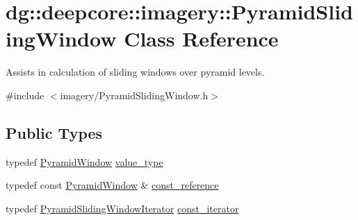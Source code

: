 \hypertarget{classdg_1_1deepcore_1_1imagery_1_1_pyramid_sliding_window}{}\section{dg\+:\+:deepcore\+:\+:imagery\+:\+:Pyramid\+Sliding\+Window Class Reference}
\label{classdg_1_1deepcore_1_1imagery_1_1_pyramid_sliding_window}


Assists in calculation of sliding windows over pyramid levels.  




{\ttfamily \#include $<$imagery/\+Pyramid\+Sliding\+Window.\+h$>$}

\subsection*{Public Types}
\begin{DoxyCompactItemize}
\item 
typedef \hyperlink{structdg_1_1deepcore_1_1imagery_1_1_pyramid_window}{Pyramid\+Window} \hyperlink{classdg_1_1deepcore_1_1imagery_1_1_pyramid_sliding_window_ab19431f1af5d94cf35d3c13e62831b0a}{value\+\_\+type}
\item 
typedef const \hyperlink{structdg_1_1deepcore_1_1imagery_1_1_pyramid_window}{Pyramid\+Window} \& \hyperlink{classdg_1_1deepcore_1_1imagery_1_1_pyramid_sliding_window_a2607e7416973611462d45f5a3772b46e}{const\+\_\+reference}
\item 
typedef \hyperlink{classdg_1_1deepcore_1_1imagery_1_1_pyramid_sliding_window_iterator}{Pyramid\+Sliding\+Window\+Iterator} \hyperlink{classdg_1_1deepcore_1_1imagery_1_1_pyramid_sliding_window_ac39f725e03255cd3776e47672a02e78f}{const\+\_\+iterator}
\end{DoxyCompactItemize}
